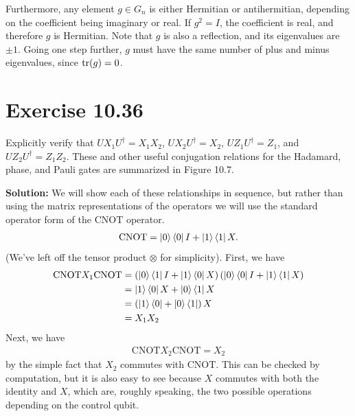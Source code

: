 \documentclass{book}
\begin{document}
    Furthermore, any element $g\in G_n$ is either Hermitian or antihermitian, depending on the coefficient being imaginary or real. If $g^2 = I$, the coefficient is real, and therefore $g$ is Hermitian. Note that $g$ is also a reflection, and its eigenvalues are $\pm 1$. Going one step further, $g$ must have the same number of plus and minus eigenvalues, since $\tr(g) = 0$.
    
\section*{Exercise 10.36}
    Explicitly verify that $U X_1 U^\dagger= X_1 X_2$, $U X_2 U^\dagger = X_2$, $U Z_1 U^\dagger = Z_1$, and $U Z_2 U^\dagger = Z_1 Z_2$. These and other useful conjugation relations for the Hadamard, phase, and Pauli gates are summarized in Figure 10.7.
    
    \textbf{Solution:} We will show each of these relationships in sequence, but rather than using the matrix representations of the operators we will use the standard operator form of the $\mathrm{CNOT}$ operator.
    \begin{align}
        \mathrm{CNOT} = \ket{0}\bra{0}I + \ket{1}\bra{1}X.
    \end{align} 
    (We've left off the tensor product $\otimes$ for simplicity).  First, we have
    \begin{align}
    \begin{aligned}
        \mathrm{CNOT}X_1 \mathrm{CNOT} &= \left(\ket{0}\bra{1}I  + \ket{1}\bra{0}X\right)\left(\ket{0}\bra{0}I + \ket{1}\bra{1} X\right) \\
        &=\ket{1}\bra{0} X + \ket{0}\bra{1}X \\
        &=\left(\ket{1}\bra{0}+\ket{0}\bra{1}\right) X \\
        &= X_1 X_2
    \end{aligned}
    \end{align}
    Next, we have
    \begin{align}
        \mathrm{CNOT} X_2 \mathrm{CNOT} = X_2
    \end{align}
    by the simple fact that $X_2$ commutes with $\mathrm{CNOT}$. This can be checked by computation, but it is also easy to see because $X$ commutes with both the identity and $X$, which are, roughly speaking, the two possible operations depending on the control qubit.
    
\end{document}
